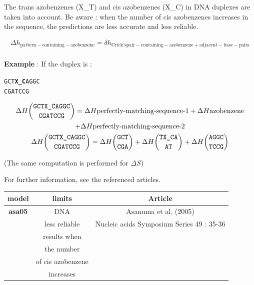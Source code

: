 \documentclass{article}
\begin{document}
The trans azobenzenes (X\_T) and cis azobenzenes (X\_C) in DNA duplexes are taken 
into account. Be aware : when the number of cis azobenzenes increases in the sequence, 
the predictions are less accurate and less reliable.

\begin{multline*}
  \Delta{}h_\mathrm{pattern-containing-azobenzene} =
  \delta{}h_\mathrm{Crick's pair-containing-azobenzene+adjacent-base-pairs}\\
\end{multline*}

\textbf{Example} :
If the duplex is :
\begin{alltt}
GCT\textbf{X\_C}AGGC
CGATCCG
\end{alltt}
\begin{multline*}
\Delta H {\mbox{\texttt{GCTX\_CAGGC}} \choose \mbox{\texttt{CGATCCG}}} =
\Delta H {\mbox{perfectly-matching-sequence-1}} +
\Delta H {\mbox{azobenzene}} \\ +
\Delta H {\mbox{perfectly-matching-sequence-2}}\\
\Delta H {\mbox{\texttt{GCTX\_CAGGC}} \choose \mbox{\texttt{CGATCCG}}} =
\Delta H {\mbox{\texttt{GCT}} \choose \mbox{\texttt{CGA}}} +
\Delta H {\mbox{\texttt{TX\_CA}} \choose \mbox{\texttt{AT}}} +
\Delta H {\mbox{\texttt{AGGC}} \choose \mbox{\texttt{TCCG}}}\\
\end{multline*}

       (The same computation is performed for $\Delta S$) 
       
For further information, see the referenced articles.

\begin{table}[hc]
\begin{tabular}[h]{| c | c | c |}
\textbf{model} & \textbf{limits} & \textbf{Article} \\
\hline
\textbf{asa05} & DNA & Asanuma et al. (2005) \\
 & less reliable & Nucleic acids Symposium Series 49 : 35-36 \\
 & results when & \\
 & the number & \\
 & of cis azobenzene & \\
 & increases & \\
 \hline
\end{tabular}
\end{table}
\end{document}
